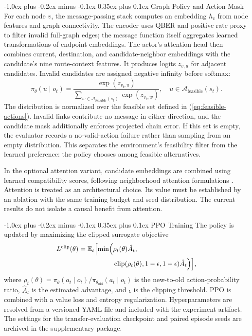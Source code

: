 \documentclass[journal]{IEEEtran}
\makeatletter
\def\subsubsection{\@startsection{subsubsection}{3}{\z@}%
  {-1.0ex plus -0.2ex minus -0.1ex}%
  {0.35ex plus 0.1ex}%
  {\normalfont\bfseries\itshape\fontsize{9.5}{11}\selectfont}}
\makeatother
\begin{document}
\subsubsection{Graph Policy and Action Mask}
For each node $v$, the message-passing stack computes an embedding $h_v$ from node features and graph connectivity. The encoder uses QBER and positive rate proxy to filter invalid full-graph edges; the message function itself aggregates learned transformations of endpoint embeddings. The actor's attention head then combines current, destination, and candidate-neighbor embeddings with the candidate's nine route-context features. It produces logits $z_{v,u}$ for adjacent candidates. Invalid candidates are assigned negative infinity before softmax:
\begin{equation}
 \pi_\theta(u\mid o_t)=\frac{\exp(z_{v_t,u})}{\sum_{w\in\mathcal{A}_{\mathrm{feasible}}(s_t)}\exp(z_{v_t,w})},\quad u\in\mathcal{A}_{\mathrm{feasible}}(s_t).
\end{equation}
The distribution is normalized over the feasible set defined in (\ref{eq:feasible-actions}). Invalid links contribute no message in either direction, and the candidate mask additionally enforces projected chain error. If this set is empty, the evaluator records a no-valid-action failure rather than sampling from an empty distribution. This separates the environment's feasibility filter from the learned preference: the policy chooses among feasible alternatives.

In the optional attention variant, candidate embeddings are combined using learned compatibility scores, following neighborhood attention formulations \cite{velickovic2018}. Attention is treated as an architectural choice. Its value must be established by an ablation with the same training budget and seed distribution. The current results do not isolate a causal benefit from attention.

\subsubsection{PPO Training}
The policy is updated by maximizing the clipped surrogate objective
\begin{equation}
\begin{aligned}
 L^{\mathrm{clip}}(\theta)=\mathbb{E}_t\Bigl[\min\Bigl(&\rho_t(\theta)\hat A_t,\\
 &\operatorname{clip}(\rho_t(\theta),1-\epsilon,1+\epsilon)\hat A_t\Bigr)\Bigr],
\end{aligned}
\end{equation}
where $\rho_t(\theta)=\pi_\theta(a_t\mid o_t)/\pi_{\theta_{\mathrm{old}}}(a_t\mid o_t)$ is the new-to-old action-probability ratio, $\hat A_t$ is the estimated advantage, and $\epsilon$ is the clipping threshold. PPO is combined with a value loss and entropy regularization. Hyperparameters are resolved from a versioned YAML file and included with the experiment artifact. The settings for the transfer-evaluation checkpoint and paired episode seeds are archived in the supplementary package.
\end{document}
